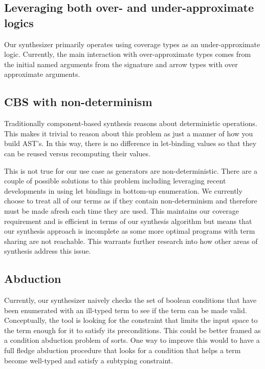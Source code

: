 \documentclass[review, sigplan]{acmart}
\begin{document}
\subsection{Leveraging both over- and under-approximate logics}
Our synthesizer primarily operates using coverage types as an under-approximate
logic. Currently, the main interaction with over-approximate types comes from the
initial named arguments from the signature and arrow types with over approximate
arguments.


\subsection{CBS with non-determinism}
Traditionally component-based synthesis reasons about deterministic operations.
This makes it trivial to reason about this problem as just a manner of how you
build AST's. In this way, there is no difference in let-binding values so that
they can be reused versus recomputing their values.

This is not true for our use case as generators are non-deterministic. There are
a couple of possible solutions to this problem including leveraging recent
developments in using let bindings in bottom-up
enumeration\cite{li2023efficient}. We currently choose to treat all of our terms
as if they contain non-determinism and therefore must be made afresh each time
they are used. This maintains our coverage requirement and is efficient in terms
of our synthesis algorithm but means that our synthesis approach is incomplete
as some more optimal programs with term sharing are not reachable. This warrants
further research into how other areas of synthesis address this issue.

\subsection{Abduction}
Currently, our synthesizer naively checks the set of boolean conditions that
have been enumerated with an ill-typed term to see if the term can be made
valid. Conceptually, the tool is looking for the constraint that limits the
input space to the term enough for it to satisfy its preconditions. This could
be better framed as a condition abduction problem of sorts. One way to improve
this would to have a full fledge abduction procedure that looks for a condition
that helps a term become well-typed and satisfy a subtyping constraint.
\end{document}
